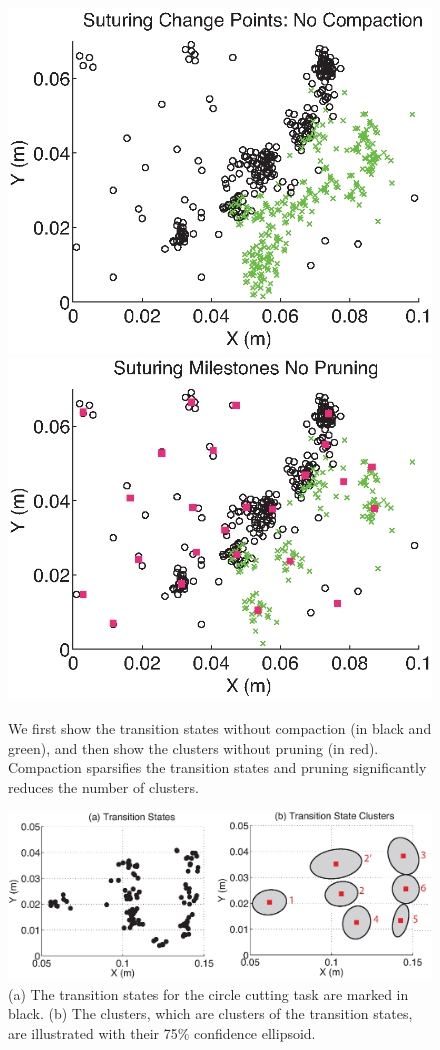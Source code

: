 
\begin{figure}[t]
    \centering
    \includegraphics[width=0.45\columnwidth]{tsc-experiments/suturing_milestones_no_compaction}
    \includegraphics[width=0.45\columnwidth]{tsc-experiments/suturing_milestones_no_pruning}
    \caption{We first show the transition states without compaction (in black and green), and then show the clusters without pruning (in red). Compaction sparsifies the transition states and pruning significantly reduces the number of clusters.}
    \label{exp:removal}
\end{figure}

\begin{figure}[t]
    \includegraphics[width=\columnwidth]{tsc-experiments/new_circle_cutting}
    \caption{(a) The transition states for the circle cutting task are marked in black. (b) The \tsc clusters, which are clusters of the transition states, are illustrated with their 75\% confidence ellipsoid.\label{exp:circ}}
\end{figure}

